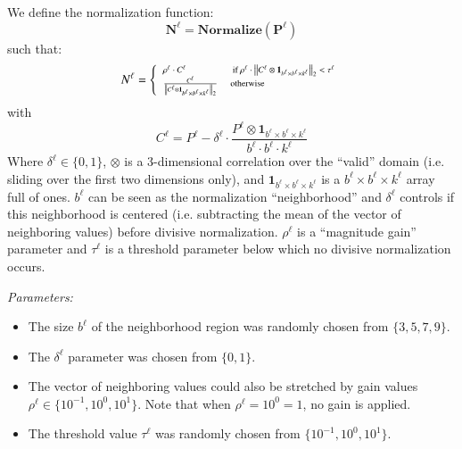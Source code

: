 We define the normalization function: 
\begin{equation}
\mathbf{N^{\ell} = Normalize(P^{\ell})}
\end{equation}
such that:
\begin{equation}\label{eq:norm}
N^{\ell} = \left\{ \scriptsize{
\begin{array}{ll}
  \rho^{\ell} \cdot C^{\ell} & \mbox{ if $ \rho^{\ell} \cdot
    \left|\left|C^{\ell} \otimes \mathbf{1}_{b^{\ell} \times b^{\ell} \times
        k^{\ell}}\right|\right|_2 < \tau^{\ell}$} \\ \frac{C^{\ell}}{\left|\left|C^{\ell}
      \otimes \mathbf{1}_{b^{\ell} \times b^{\ell} \times k^{\ell}}\right|\right|_2} &
  \mbox{otherwise}
\end{array}
} \right.
\end{equation}
with
\begin{equation}
C^{\ell} = P^{\ell}-\delta^{\ell} \cdot \frac{P^{\ell} \otimes
  \mathbf{1}_{b^{\ell} \times b^{\ell} \times k^{\ell}}}{b^{\ell} \cdot b^{\ell}
  \cdot k^{\ell}}
\end{equation}
Where $\delta^{\ell} \in \{0,1\}$, $\otimes$ is a 3-dimensional correlation over
the ``valid'' domain (i.e. sliding over the first two dimensions only), and
$\mathbf{1}_{b^{\ell} \times b^{\ell} \times k^{\ell}}$ is a $b^{\ell} \times
b^{\ell} \times k^{\ell}$ array full of ones.  $b^{\ell}$ can be seen as the
normalization ``neighborhood'' and $\delta^{\ell}$ controls if this neighborhood
is centered (i.e. subtracting the mean of the vector of neighboring values)
before divisive normalization.  $\rho^{\ell}$ is a ``magnitude gain'' parameter
and $\tau^{\ell}$ is a threshold parameter below which no divisive normalization
occurs.

\emph{Parameters:}
\begin{itemize}
\item The size $b^{\ell}$ of the neighborhood region was randomly chosen from
  $\{3,5,7,9\}$.
\item The $\delta^{\ell}$ parameter was chosen from $\{0,1\}$.
\item The vector of neighboring values could also be stretched by gain values
  $\rho^{\ell} \in \{10^{-1}, 10^{0}, 10^{1}\}$. Note that when $\rho^{\ell} =
  10^{0} = 1$, no gain is applied.
\item The threshold value $\tau^{\ell}$ was randomly chosen from $\{10^{-1},
  10^{0}, 10^{1}\}$.
\end{itemize}

